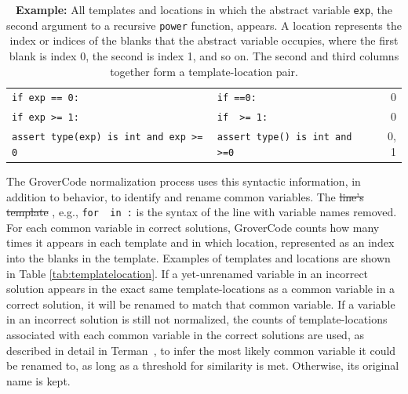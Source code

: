 \documentclass[12pt,twoside]{mitthesis}
\providecommand{\DIFaddtex}[1]{{\protect\color{blue}\uwave{#1}}} %
\providecommand{\DIFdeltex}[1]{{\protect\color{red}\sout{#1}}}                      %
\providecommand{\DIFaddbegin}{} %
\providecommand{\DIFaddend}{} %
\providecommand{\DIFdelbegin}{} %
\providecommand{\DIFdelend}{} %
\providecommand{\DIFadd}[1]{\texorpdfstring{\DIFaddtex{#1}}{#1}} %
\providecommand{\DIFdel}[1]{\texorpdfstring{\DIFdeltex{#1}}{}} %
\begin{document}
\begin{table}
\begin{tabular}{l l r}
\footnotesize{\texttt{if exp == 0:}} & \footnotesize{\texttt{if \underline{\hspace{1em}}==0:}} & 0 \\
\footnotesize{\texttt{if exp >= 1:}} & \footnotesize{\texttt{if \underline{\hspace{1em}} >= 1:}} & 0 \\
\footnotesize{\texttt{assert type(exp) is int and exp >= 0}} & \footnotesize{\texttt{assert type(\underline{\hspace{1em}}) is int and \underline{\hspace{1em}}>=0}} & 0, 1 \\
\end{tabular}
\caption{\textbf{Example:} All templates and locations in which the abstract variable \texttt{exp}, the second argument to a recursive \texttt{power} function, appears. A location represents the index or indices of the blanks that the abstract variable occupies, where the first blank is index 0, the second is index 1, and so on. The second and third columns together form a template-location pair.} 
\label{tab:templatelocation}
\end{table}

The GroverCode normalization process uses this syntactic information, in addition to behavior, to identify and rename common variables. The \DIFdelbegin \DIFdel{line's template }\DIFdelend \DIFaddbegin \DIFadd{template of a line}\DIFaddend , e.g., \texttt{for \underline{\hspace{1em}} in \underline{\hspace{1em}}:} is the syntax of the line with variable names removed. For each common variable in correct solutions, GroverCode counts how many times it appears in each template and in which location, represented as an index into the blanks in the template. Examples of templates and locations are shown in Table \autoref{tab:templatelocation}. If a yet-unrenamed variable in an incorrect solution appears in the exact same template-locations as a common variable in a correct solution, it will be renamed to match that common variable. If a variable in an incorrect solution is still not normalized, the counts of template-locations associated with each common variable in the correct solutions are used, as described in detail in Terman~\cite{staceythesis}, to infer the most likely common variable it could be renamed to, as long as a threshold for similarity is met. Otherwise, its original name is kept.
\end{document}
